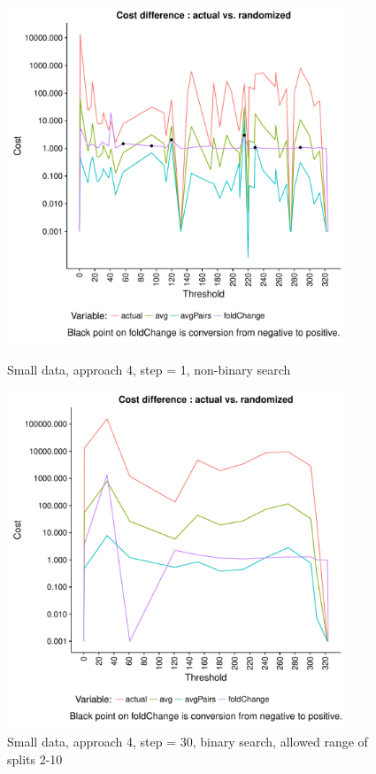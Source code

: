 \documentclass[a4paper,10pt]{article}
\theoremstyle{plain}
\theoremstyle{definition}
\begin{document}
\begin{figure}[H]
	\centering
	\begin{minipage}{0.80\textwidth}
		\centering
		\includegraphics[width=0.9\textwidth]{./plots/plotCostGap/plotCostGapSmallDataAp4Step1K5Seed7NoBinary.pdf}
		\caption{Small data, approach 4, step = 1, non-binary search}
		\label{fig:hcMaxGapSmallDataAp4Step1NoBinary}
	\end{minipage}
	\begin{minipage}{0.80\textwidth}
		\centering
		\includegraphics[width=0.9\textwidth]{./plots/plotCostGap/plotCostGapSmallDataAp4Step30K5Seed42Binary.pdf}
		\caption{Small data, approach 4, step = 30, binary search, allowed range of splits 2-10}
		\label{fig:hcMaxGapSmallDataAp4Step30Binary}
	\end{minipage}
\end{figure}
\end{document}
